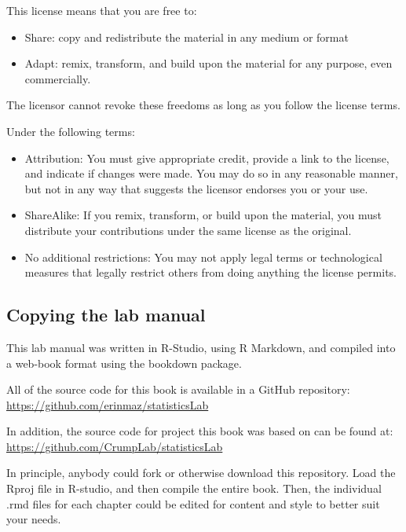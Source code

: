 \documentclass[
]{book}
\providecommand{\tightlist}{%
  \setlength{\itemsep}{0pt}\setlength{\parskip}{0pt}}
\begin{document}
This license means that you are free to:

\begin{itemize}
\tightlist
\item
  Share: copy and redistribute the material in any medium or format
\item
  Adapt: remix, transform, and build upon the material for any purpose, even commercially.
\end{itemize}

The licensor cannot revoke these freedoms as long as you follow the license terms.

Under the following terms:

\begin{itemize}
\tightlist
\item
  Attribution: You must give appropriate credit, provide a link to the license, and indicate if changes were made. You may do so in any reasonable manner, but not in any way that suggests the licensor endorses you or your use.
\item
  ShareAlike: If you remix, transform, or build upon the material, you must distribute your contributions under the same license as the original.
\item
  No additional restrictions: You may not apply legal terms or technological measures that legally restrict others from doing anything the license permits.
\end{itemize}

\hypertarget{copying-the-lab-manual}{%
\subsection{Copying the lab manual}\label{copying-the-lab-manual}}

This lab manual was written in R-Studio, using R Markdown, and compiled into a web-book format using the bookdown package.

All of the source code for this book is available in a GitHub repository: \url{https://github.com/erinmaz/statisticsLab}

In addition, the source code for project this book was based on can be found at: \url{https://github.com/CrumpLab/statisticsLab}

In principle, anybody could fork or otherwise download this repository. Load the Rproj file in R-studio, and then compile the entire book. Then, the individual .rmd files for each chapter could be edited for content and style to better suit your needs.
\end{document}
